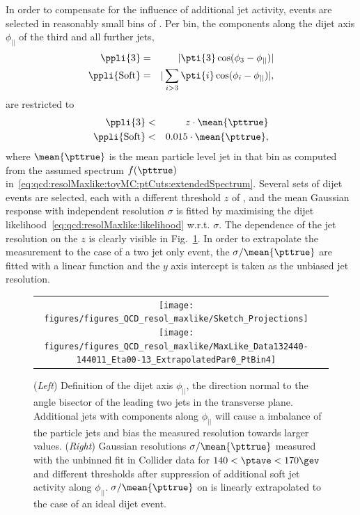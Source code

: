 
In order to compensate for the influence of additional jet activity,
events are selected in reasonably small bins of \ptave.
Per bin, the \pt components along the dijet axis $\phi_{||}$ of the third and all further jets,
\begin{eqnarray*}
  \ppli{3} & = & |\pti{3}\cos(\phi_{3}-\phi_{||})| \\
  \ppli{\text{Soft}} & = & |\sum_{i>3}\pti{i}\cos(\phi_{i}-\phi_{||})|,
\end{eqnarray*}
are restricted to
\begin{eqnarray*}
  \ppli{3} & < & z\cdot\mean{\pttrue} \\
  \ppli{\text{Soft}} & < & 0.015\cdot\mean{\pttrue},
\end{eqnarray*}
where $\mean{\pttrue}$ is the mean particle level jet \pt in that bin
as computed from the assumed spectrum $f(\pttrue)$
in~\eqref{eq:qcd:resolMaxlike:toyMC:ptCuts:extendedSpectrum}.
Several sets of dijet events are selected, each with a different
threshold $z$ of , and the mean Gaussian response with \pt
independent resolution $\sigma$ is fitted by maximising the dijet
likelihood~\eqref{eq:qcd:resolMaxlike:likelihood} w.r.t. $\sigma$.
The dependence of the jet \pt resolution on the $z$ is clearly visible in Fig.~\ref{fig:qcd:resolMaxlike:biasAddJets}.
In order to extrapolate the measurement to the case of a two jet only
event, the \mbox{$\sigma/\mean{\pttrue}$} are fitted with a linear
function and the $y$ axis intercept is taken as the unbiased jet \pt
resolution.

\begin{figure}[ht]
  \centering
  \begin{tabular}{cc}
    \texttt{[image: figures/figures\_QCD\_resol\_maxlike/Sketch\_Projections]}
    \texttt{[image: figures/figures\_QCD\_resol\_maxlike/MaxLike\_Data132440-144011\_Eta00-13\_ExtrapolatedPar0\_PtBin4]}\\
  \end{tabular}
  \caption{(\textit{Left}) Definition of the dijet axis $\phi_{||}$, the direction normal to the
    angle bisector of the leading two jets in the transverse plane.
    Additional jets with \pt components along $\phi_{||}$ will cause
    a \pt imbalance of the particle jets and bias the measured
    resolution towards larger values.
    (\textit{Right}) Gaussian resolutions \mbox{$\sigma/\mean{\pttrue}$} measured with the unbinned
    fit in Collider data for \mbox{$140 < \ptave < 170\gev$} and different 
    thresholds after suppression of additional soft jet activity along
    $\phi_{||}$. 
    \mbox{$\sigma/\mean{\pttrue}$} on  is linearly
    extrapolated to the case of an ideal dijet event.
  }
  \label{fig:qcd:resolMaxlike:biasAddJets}
\end{figure}


